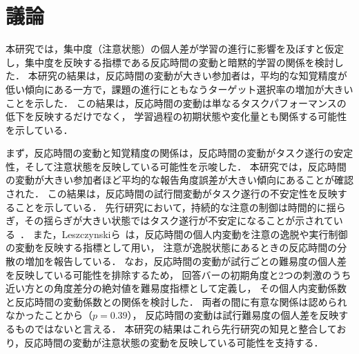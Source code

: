\section{議論}
本研究では，集中度（注意状態）の個人差が学習の進行に影響を及ぼすと仮定し，集中度を反映する指標である反応時間の変動と暗黙的学習の関係を検討した．
本研究の結果は，反応時間の変動が大きい参加者は，平均的な知覚精度が低い傾向にある一方で，課題の進行にともなうターゲット選択率の増加が大きいことを示した．
この結果は，反応時間の変動は単なるタスクパフォーマンスの低下を反映するだけでなく，
学習過程の初期状態や変化量とも関係する可能性を示している．

まず，反応時間の変動と知覚精度の関係は，反応時間の変動がタスク遂行の安定性，そして注意状態を反映している可能性を示唆した．
本研究では，反応時間の変動が大きい参加者ほど平均的な報告角度誤差が大きい傾向にあることが確認された．
この結果は，反応時間の試行間変動がタスク遂行の不安定性を反映することを示している．
先行研究において，持続的な注意の制御は時間的に揺らぎ，その揺らぎが大きい状態ではタスク遂行が不安定になることが示されている~\cite{west2002lapses}．
また，Leszczynskiら~\cite{leszczynski2017mind}は，反応時間の個人内変動を注意の逸脱や実行制御の変動を反映する指標として用い，
注意が逸脱状態にあるときの反応時間の分散の増加を報告している．
なお，反応時間の変動が試行ごとの難易度の個人差を反映している可能性を排除するため，
回答バーの初期角度と2つの刺激のうち近い方との角度差分の絶対値を難易度指標として定義し，
その個人内変動係数と反応時間の変動係数との関係を検討した．
両者の間に有意な関係は認められなかったことから（$p = 0.39$），
反応時間の変動は試行難易度の個人差を反映するものではないと言える．
本研究の結果はこれら先行研究の知見と整合しており，反応時間の変動が注意状態の変動を反映している可能性を支持する．


